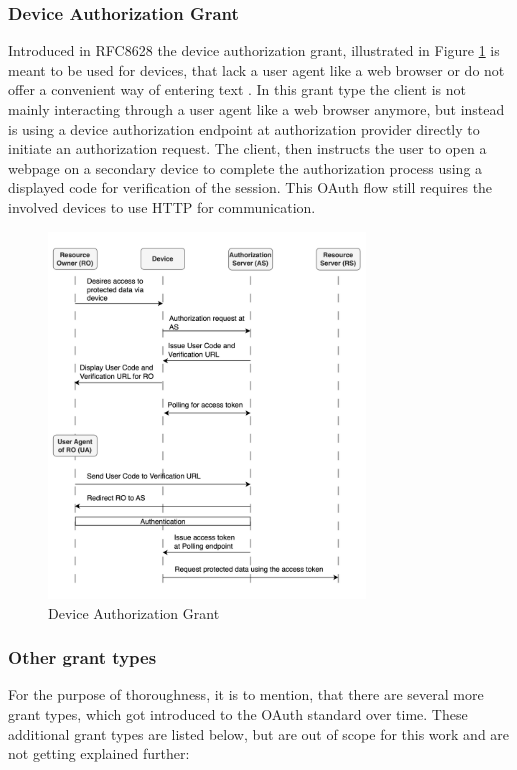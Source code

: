 \subsubsection{Device Authorization Grant}
Introduced in RFC8628 the device authorization grant, illustrated in Figure \ref{fig:device_authorization_grant} is meant to be used for
devices, that lack a user agent like a web browser or do not offer a convenient
way of entering text \cite{denniss2019oauth}. In this grant type the client is
not mainly interacting through a user agent like a web browser anymore, but instead is using a device authorization endpoint at authorization provider directly to initiate an authorization request. The client, then instructs the user to open a webpage on a secondary device to complete the authorization process using a displayed code for verification of the session. This OAuth flow still requires the involved devices to use HTTP for communication.

\begin{figure}[H]
	\sffamily\footnotesize
	\includegraphics[width=0.75\textwidth]{pic/device_authorization_grant.png}
	\unitlength=0.75mm
	\linethickness{0.4pt}
	\caption{Device Authorization Grant}
	\label{fig:device_authorization_grant}
\end{figure}

\subsubsection{Other grant types}
For the purpose of thoroughness, it is to mention, that there are several more grant types, which got introduced to the OAuth standard over time. These additional grant types are listed below, but are out of scope for this work and are not getting explained further: 

